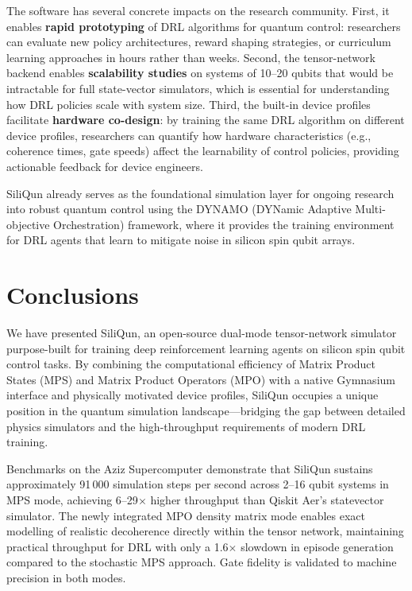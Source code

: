 \documentclass[preprint,12pt, a4paper]{elsarticle}
\begin{document}
The software has several concrete impacts on the research community. First, it enables \textbf{rapid prototyping} of DRL algorithms for quantum control: researchers can evaluate new policy architectures, reward shaping strategies, or curriculum learning approaches in hours rather than weeks. Second, the tensor-network backend enables \textbf{scalability studies} on systems of 10--20 qubits that would be intractable for full state-vector simulators, which is essential for understanding how DRL policies scale with system size. Third, the built-in device profiles facilitate \textbf{hardware co-design}: by training the same DRL algorithm on different device profiles, researchers can quantify how hardware characteristics (e.g., coherence times, gate speeds) affect the learnability of control policies, providing actionable feedback for device engineers.

SiliQun already serves as the foundational simulation layer for ongoing research into robust quantum control using the DYNAMO (DYNamic Adaptive Multi-objective Orchestration) framework, where it provides the training environment for DRL agents that learn to mitigate noise in silicon spin qubit arrays.

\section{Conclusions}
\label{sec:conclusions}

We have presented SiliQun, an open-source dual-mode tensor-network simulator purpose-built for training deep reinforcement learning agents on silicon spin qubit control tasks. By combining the computational efficiency of Matrix Product States (MPS) and Matrix Product Operators (MPO) with a native Gymnasium interface and physically motivated device profiles, SiliQun occupies a unique position in the quantum simulation landscape---bridging the gap between detailed physics simulators and the high-throughput requirements of modern DRL training.

Benchmarks on the Aziz Supercomputer demonstrate that SiliQun sustains approximately 91\,000 simulation steps per second across 2--16 qubit systems in MPS mode, achieving 6--29$\times$ higher throughput than Qiskit Aer's statevector simulator. The newly integrated MPO density matrix mode enables exact modelling of realistic decoherence directly within the tensor network, maintaining practical throughput for DRL with only a 1.6$\times$ slowdown in episode generation compared to the stochastic MPS approach. Gate fidelity is validated to machine precision in both modes.
\end{document}
